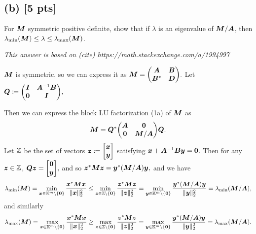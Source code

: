 \documentclass[twoside,10pt]{article}
\newcommand{\Z}{\mathbbm{Z}}
\begin{document}
\subsection*{(b) [5 pts]} 
For $\bm{M}$ symmetric positive definite, show that if $\lambda$ is an eigenvalue of $\bm{M} / \bm{A}$, then $\lambda_{\min}\left(\mtx{M} \right) \leq \lambda \leq \lambda_{\max}\left(\mtx{M}\right)$.

\textit{This answer is based on (cite) https://math.stackexchange.com/a/1994997}

$\bm{M}$ is symmetric, so we can express it as $\mtx{M} = \begin{pmatrix}
  \mtx{A} & \mtx{B}\\
  \mtx{B}^{*} & \mtx{D}
\end{pmatrix}.$ Let $\mtx{Q} \coloneqq \begin{pmatrix}
  \mtx{I} & \mtx{A}^{-1} \mtx{B} \\
  \mtx{0} & \mtx{I}
\end{pmatrix},$

Then we can express the block LU factorization (1a) of $\bm{M}$ as
\begin{equation*}
  \mtx{M} = 
  \mtx{Q}^{*} 
  \begin{pmatrix}
    \mtx{A} & \mtx{0} \\
    \mtx{0} & \mtx{M} / \mtx{A}
  \end{pmatrix}
  \mtx{Q}. 
\end{equation*}
Let $\Z$ be the set of vectors $\bm{z} \coloneqq \begin{bmatrix}\bm{x}\\\bm{y}\end{bmatrix}$ satisfying $\bm{x} + \bm{A}^{-1}\bm{B}\bm{y} = \bm{0}.$ 
Then for any $\vct{z} \in \Z$, $\mtx{Q}\vct{z} = \begin{bmatrix}\vct{0}\\\vct{y}\end{bmatrix},$ and so $\vct{z}^{*} \mtx{M}\vct{z} = \vct{y}^{*}\left(\mtx{M} / \mtx{A}\right)\vct{y},$ and we have
$$\lambda_{\min}\left(\mtx{M}\right) =\min \limits_{\vct{x} \in \K^m \setminus \{\vct{0}\}} \frac{\vct{x}^{*}\mtx{M}\vct{x}}{\|\vct{x}\|_2^2} \leq \min \limits_{\vct{z} \in \Z \setminus \{\vct{0}\}} \frac{\vct{z}^{*} \mtx{M}\vct{z}}{\|\vct{z}\|_2^2} = \min \limits_{\vct{y} \in \K^m \setminus \{\vct{0}\}} \frac{\vct{y}^{*} \left(\mtx{M}/\mtx{A}\right)\vct{y}}{\|\vct{y}\|_2^2} = \lambda_{\min}\left(\mtx{M} / \mtx{A}\right),$$
and similarly
$$\lambda_{\max}\left(\mtx{M}\right) =\max \limits_{\vct{x} \in \K^m \setminus \{\vct{0}\}} \frac{\vct{x}^{*}\mtx{M}\vct{x}}{\|\vct{x}\|_2^2} \geq \max \limits_{\vct{z} \in \Z \setminus \{\vct{0}\}} \frac{\vct{z}^{*} \mtx{M}\vct{z}}{\|\vct{z}\|_2^2} = \max \limits_{\vct{y} \in \K^m \setminus \{\vct{0}\}} \frac{\vct{y}^{*} \left(\mtx{M}/\mtx{A}\right)\vct{y}}{\|\vct{y}\|_2^2} = \lambda_{\max}\left(\mtx{M} / \mtx{A}\right).$$
 
\end{document}
